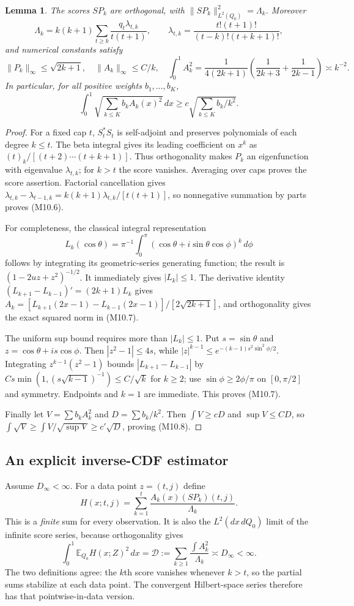 \documentclass[11pt,a4paper]{article}
\newtheorem{lemma}[theorem]{Lemma}
\theoremstyle{definition}\newtheorem{definition}[theorem]{Definition}
\theoremstyle{remark}\newtheorem{remark}[theorem]{Remark}
\newcommand{\E}{\mathbb E}\newcommand{\one}{\mathbf 1}\newcommand{\1}{\mathbf 1}
\numberwithin{equation}{section}
\begin{document}
\begin{lemma}\label{M10-lem:ingredients}
The scores $SP_k$ are orthogonal, with $\|SP_k\|_{L^2(Q_0)}^2=\Lambda_k$. Moreover
\[
 \Lambda_k=k(k+1)\sum_{t\ge k}\frac{q_t\lambda_{t,k}}{t(t+1)},\qquad
 \lambda_{t,k}=\frac{t!(t+1)!}{(t-k)!(t+k+1)!},\tag{M10.6}
\]
and numerical constants satisfy
\[
 \|P_k\|_\infty\le\sqrt{2k+1},\quad
 \|A_k\|_\infty\le C/k,\quad
 \int_0^1 A_k^2=\frac1{4(2k+1)}\left(\frac1{2k+3}+\frac1{2k-1}\right)\asymp k^{-2}.
\tag{M10.7}
\]
In particular, for all positive weights $b_1,\ldots,b_K$,
\[
 \int_0^1\sqrt{\sum_{k\le K}b_kA_k(x)^2}\,dx
 \ge c\sqrt{\sum_{k\le K}b_k/k^2}.\tag{M10.8}
\]
\end{lemma}
\begin{proof}
For a fixed cap $t$, $S_t^*S_t$ is self-adjoint and preserves polynomials of each degree $k\le t$. The beta integral gives its leading coefficient on $x^k$ as $(t)_k/[(t+2)\cdots(t+k+1)]$. Thus orthogonality makes $P_k$ an eigenfunction with eigenvalue $\lambda_{t,k}$; for $k>t$ the score vanishes. Averaging over caps proves the score assertion. Factorial cancellation gives
$\lambda_{t,k}-\lambda_{t-1,k}=k(k+1)\lambda_{t,k}/[t(t+1)]$, so nonnegative summation by parts proves (M10.6).

For completeness, the classical integral representation
\[
 L_k(\cos\theta)=\pi^{-1}\int_0^\pi
       (\cos\theta+i\sin\theta\cos\phi)^k\,d\phi
\]
follows by integrating its geometric-series generating function; the result is $(1-2uz+z^2)^{-1/2}$. It immediately gives $|L_k|\le1$. The derivative identity $(L_{k+1}-L_{k-1})'=(2k+1)L_k$ gives
$A_k=[L_{k+1}(2x-1)-L_{k-1}(2x-1)]/[2\sqrt{2k+1}]$, and orthogonality gives the exact squared norm in (M10.7).

The uniform sup bound requires more than $|L_k|\le1$. Put $s=\sin\theta$ and $z=\cos\theta+i s\cos\phi$. Then $|z^2-1|\le4s$, while $|z|^{k-1}\le e^{-(k-1)s^2\sin^2\phi/2}$. Integrating $z^{k-1}(z^2-1)$ bounds $|L_{k+1}-L_{k-1}|$ by
$Cs\min(1,(s\sqrt{k-1})^{-1})\le C/\sqrt k$ for $k\ge2$; use $\sin\phi\ge2\phi/\pi$ on $[0,\pi/2]$ and symmetry. Endpoints and $k=1$ are immediate. This proves (M10.7).

Finally let $V=\sum b_kA_k^2$ and $D=\sum b_k/k^2$. Then $\int V\ge cD$ and $\sup V\le CD$, so $\int\sqrt V\ge\int V/\sqrt{\sup V}\ge c'\sqrt D$, proving (M10.8).
\end{proof}

\subsection{An explicit inverse-CDF estimator}\label{M10-sec-3}
Assume $D_\infty<\infty$. For a data point $z=(t,j)$ define
\[
 H(x;t,j)=\sum_{k=1}^{t}\frac{A_k(x)(SP_k)(t,j)}{\Lambda_k}.\tag{M10.9}
\]
This is a \emph{finite} sum for every observation. It is also the $L^2(dx\,dQ_0)$ limit of the infinite score series, because orthogonality gives
\[
 \int_0^1\E_{Q_0}H(x;Z)^2\,dx
 =\mathcal D:=\sum_{k\ge1}\frac{\int A_k^2}{\Lambda_k}\asymp D_\infty<\infty.
\tag{M10.10}
\]
The two definitions agree: the $k$th score vanishes whenever $k>t$, so the partial sums stabilize at each data point. The convergent Hilbert-space series therefore has that pointwise-in-data version.
\end{document}
